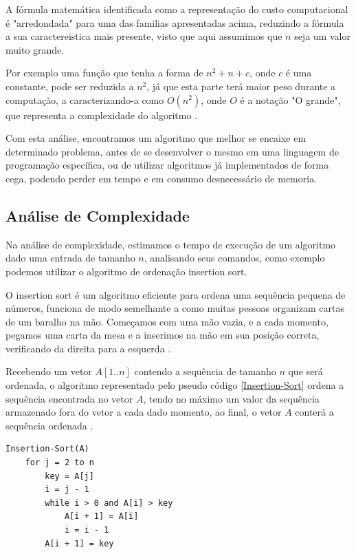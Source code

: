 \documentclass[
	12pt,				%
	openright,			%
	oneside,			%
	a4paper,			%
	english,			%
	brazil				%
	]{abntex2}
\begin{document}
A fórmula matemática identificada como a representação do custo computacional é "arredondada" para uma das familias
apresentadas acima, reduzindo a fórmula a sua caractereistica mais presente, visto que aqui assumimos que $n$ seja
um valor muito grande. 

Por exemplo uma função que tenha a forma de $n^2 + n + c$, onde $c$ é uma constante, pode ser reduzida a $n^2$, 
já que esta parte terá maior peso durante a computação, a caracterizando-a como $O(n^2)$, onde $O$ é a notação 
"O grande", que representa a complexidade do algoritmo \cite{introductionAlgorthms}.

Com esta análise, encontramos um algoritmo que melhor se encaixe em determinado problema, antes de se
desenvolver o mesmo em uma linguagem de programação específica, ou de utilizar algoritmos já implementados de forma
cega, podendo perder em tempo e em consumo desnecessário de memoria.

\subsection{Análise de Complexidade}

Na análise de complexidade, estimamos o tempo de execução de um algoritmo dado uma entrada de tamanho $n$, analisando 
seus comandos, como exemplo podemos utilizar o algoritmo de ordenação insertion sort. 

O insertion sort é um algoritmo eficiente para ordena uma sequência pequena de números, funciona de modo semelhante a
como muitas pessoas organizam cartas de um baralho na mão. Começamos com uma mão vazia, e a cada momento, pegamos uma
carta da mesa e a inserimos na mão em sua posição correta, verificando da direita para a esquerda \cite{introductionAlgorthms}.

Recebendo um vetor $A[1..n]$ contendo a sequência de tamanho $n$ que será ordenada,  o algoritmo representado pelo
pseudo código \ref{Insertion-Sort} ordena a sequência encontrada no vetor $A$, tendo no máximo um valor da sequência 
armazenado fora do vetor a cada dado momento, ao final, o vetor $A$ conterá a sequência ordenada \cite{introductionAlgorthms}.

\lstset{style=psceudo}
\begin{lstlisting}[caption={\label{Insertion-Sort}Insertion-Sort}]
	Insertion-Sort(A)
	for j = 2 to n
		key = A[j]
		i = j - 1
		while i > 0 and A[i] > key
			A[i + 1] = A[i]
			i = i - 1
		A[i + 1] = key	
\end{lstlisting}
\end{document}

